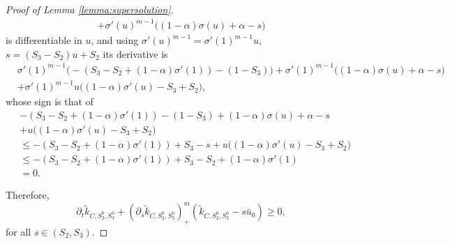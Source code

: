 \documentclass[10pt,a4paper]{amsart}
\newcommand{\al}{\alpha}
\newcommand{\p}{{\partial}}
\begin{document}
\begin{proof}[Proof of Lemma \ref{lemma:supersolution}]
\begin{multline*}
    + \sigma'(u)^{m-1} \big( (1-\al) \sigma(u) + \al - s \big)
\end{multline*}
is differentiable in $u$, and using  $\sigma'(u)^{m-1} = \sigma'(1)^{m-1} u$, $s= (S_3 - S_2) u + S_2$ its derivative is 
\begin{align*}
    &\sigma'(1)^{m-1}   \big( - (S_3-S_2 + (1-\al)\sigma'(1)) - (1-S_3)\big) 
    + \sigma'(1)^{m-1} \big( (1-\al) \sigma(u) + \al - s \big) \\
    &+ \sigma'(1)^{m-1}u \big( (1-\al) \sigma'(u) - S_3+S_2 \big),
\end{align*}
whose sign is that of
\begin{align*}
     &  - (S_3-S_2 + (1-\al)\sigma'(1)) - (1-S_3) 
    +  (1-\al) \sigma(u) + \al - s  \\
    &+ u \big( (1-\al) \sigma'(u) - S_3+S_2 \big)\\
    &\le  - (S_3-S_2 + (1-\al)\sigma'(1)) +S_3- s  
    + u \big( (1-\al) \sigma'(u) - S_3+S_2 \big) \\
    &\le  - (S_3-S_2 + (1-\al)\sigma'(1)) + S_3-S_2 + (1-\al)\sigma'(1) \\
    &= 0.
\end{align*}

Therefore, 
\begin{equation*}
    \p_t \tilde k_{C,S_2^0,S_3^0} + (\p_s \tilde k_{C,S_2^0,S_3^0})^m_+ (\tilde k_{C,S_2^0,S_3^0}-s\bar u_0) \ge 0,
\end{equation*}
for all $s\in (S_2, S_3)$.


\end{proof}
\end{document}
